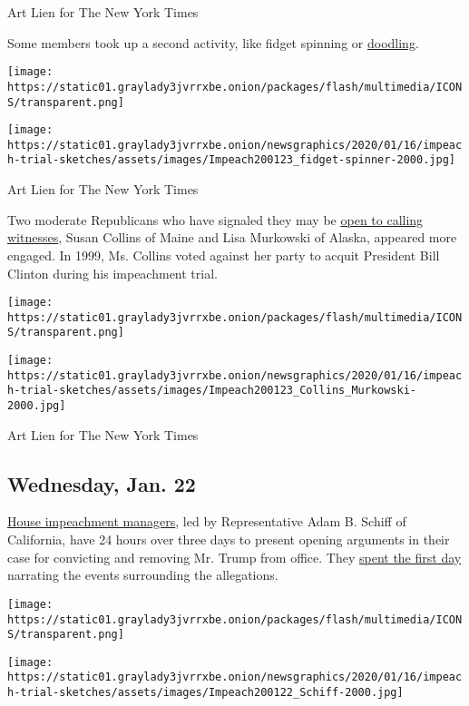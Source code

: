 Art Lien for The New York Times

Some members took up a second activity, like fidget spinning or
\href{https://www.nytimes3xbfgragh.onion/live/2020/impeachment-trial-live-01-23/rand-paul-takes-a-break-from-doodling-to-silently-make-a-point\#live-blog-list}{doodling}.

\texttt{[image: https://static01.graylady3jvrrxbe.onion/packages/flash/multimedia/ICONS/transparent.png]}

\texttt{[image: https://static01.graylady3jvrrxbe.onion/newsgraphics/2020/01/16/impeach-trial-sketches/assets/images/Impeach200123\_fidget-spinner-2000.jpg]}

Art Lien for The New York Times

Two moderate Republicans who have signaled they may be
\href{https://www.nytimes3xbfgragh.onion/2020/01/14/us/politics/republicans-impeachment-witnesses.html}{open
to calling witnesses}, Susan Collins of Maine and Lisa Murkowski of
Alaska, appeared more engaged. In 1999, Ms. Collins voted against her
party to acquit President Bill Clinton during his impeachment trial.

\texttt{[image: https://static01.graylady3jvrrxbe.onion/packages/flash/multimedia/ICONS/transparent.png]}

\texttt{[image: https://static01.graylady3jvrrxbe.onion/newsgraphics/2020/01/16/impeach-trial-sketches/assets/images/Impeach200123\_Collins\_Murkowski-2000.jpg]}

Art Lien for The New York Times

\hypertarget{wednesday-jan-22}{%
\subsection{Wednesday, Jan. 22}\label{wednesday-jan-22}}

\href{https://www.nytimes3xbfgragh.onion/2020/01/22/us/impeachment-managers.html}{House
impeachment managers}, led by Representative Adam B. Schiff of
California, have 24 hours over three days to present opening arguments
in their case for convicting and removing Mr. Trump from office. They
\href{https://www.nytimes3xbfgragh.onion/2020/01/22/us/politics/trump-impeachment.html?action=click\&module=Top\%20Stories\&pgtype=Homepage\#link-14ff5bde}{spent
the first day} narrating the events surrounding the allegations.

\texttt{[image: https://static01.graylady3jvrrxbe.onion/packages/flash/multimedia/ICONS/transparent.png]}

\texttt{[image: https://static01.graylady3jvrrxbe.onion/newsgraphics/2020/01/16/impeach-trial-sketches/assets/images/Impeach200122\_Schiff-2000.jpg]}

